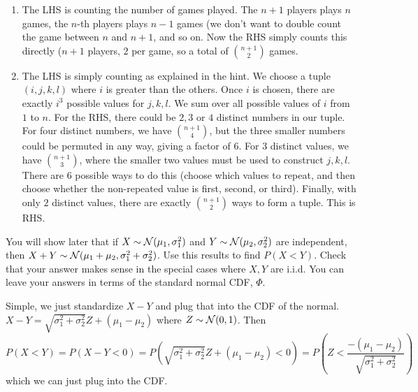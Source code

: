 \documentclass[11pt]{article}
\begin{document}
\begin{solution}
\begin{enumerate}
\item The LHS is counting the number of games played. The $n+1$ players plays $n$ games, the $n$-th players plays $n-1$ games (we don't want to double count the game between $n$ and $n+1$, and so on. Now the RHS simply counts this directly ($n+1$ players, $2$ per game, so a total of ${n+1 \choose 2}$ games.

\item The LHS is simply counting as explained in the hint. We choose a tuple $(i,j,k,l)$ where $i$ is greater than the others. Once $i$ is chosen, there are exactly $i^3$ possible values for $j,k,l$. We sum over all possible values of $i$ from $1$ to $n$. For the RHS, there could be $2,3$ or $4$ distinct numbers in our tuple. For four distinct numbers, we have ${n+1 \choose 4}$, but the three smaller numbers could be permuted in any way, giving a factor of $6$. For $3$ distinct values, we have ${n + 1 \choose 3}$, where the smaller two values must be used to construct $j,k,l$. There are $6$ possible ways to do this (choose which values to repeat, and then choose whether the non-repeated value is first, second, or third). Finally, with only $2$ distinct values, there are exactly ${n+1 \choose 2}$ ways to form a tuple. This is RHS.
\end{enumerate}
\end{solution}

\begin{exercise}
You will show later that if $X \sim \mathcal{N}(\mu_1, \sigma_1^2)$ and $Y \sim \mathcal{N}(\mu_2, \sigma_2^2)$ are independent, then $X + Y \sim \mathcal{N}(\mu_1 + \mu_2, \sigma_1^2 + \sigma_2^2)$. Use this results to find $P(X < Y)$. Check that your answer makes sense in the special cases where $X,Y$ are i.i.d. You can leave your answers in terms of the standard normal CDF, $\Phi$.
\end{exercise}

\begin{solution}
Simple, we just standardize $X - Y$ and plug that into the CDF of the normal. $X - Y = \sqrt{\sigma_1^2 + \sigma_2^2}Z + (\mu_1 - \mu_2)$ where $Z \sim \mathcal{N}(0,1)$. Then
$$
P(X < Y) = P(X - Y < 0) = P(\sqrt{\sigma_1^2 + \sigma_2^2}Z + (\mu_1 - \mu_2) < 0) = P(Z < \frac{-(\mu_1-\mu_2)}{\sqrt{\sigma_1^2 + \sigma_2^2}})
$$
which we can just plug into the CDF.
\end{solution}
\end{document}
